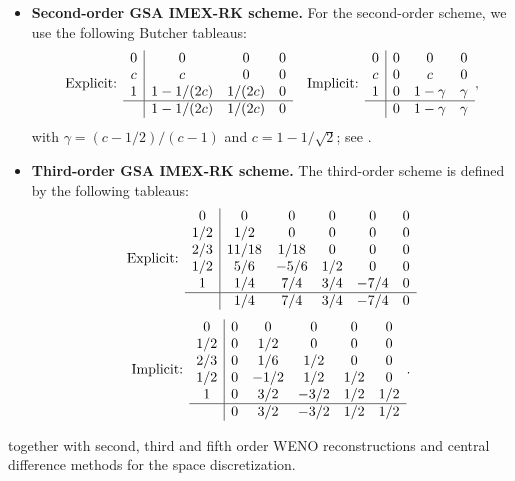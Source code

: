 \documentclass[final,11pt]{siamart251216}
\numberwithin{equation}{section}
\theoremstyle{definition}
\theoremstyle{remark}
\begin{document}
\begin{itemize}
    \item \textbf{Second-order GSA IMEX-RK scheme.}
    For the second-order scheme, we use the following Butcher tableaus:
    \begin{equation}
    \label{SecondOrderIMEX}
    \text{Explicit: } 
    \begin{array}{c|ccc}
        0 & 0 & 0 & 0 \\
        c & c & 0 & 0 \\
        1 & 1-1/(2c) & 1/(2c) & 0 \\ \hline
          & 1-1/(2c) & 1/(2c) & 0
    \end{array} \quad
    \text{Implicit: }
    \begin{array}{c|ccc}
        0 & 0 & 0 & 0 \\
        c & 0 & c & 0 \\
        1 & 0 & 1-\gamma & \gamma \\ \hline
          & 0 & 1-\gamma & \gamma
    \end{array},
    \end{equation}
    with $\gamma = (c-1/2)/(c-1)$ and $c = 1-1/\sqrt{2}$; see \cite{Bosc}.

    \item \textbf{Third-order GSA IMEX-RK scheme.}
    The third-order scheme is defined by the following tableaus:
    \begin{equation}
    \label{ThirdOrderIMEX}
    \text{Explicit: } 
    \begin{array}{c|ccccc}
        0           & 0 & 0 & 0 & 0 & 0 \\ 
        1/2         & 1/2 & 0 & 0 & 0 & 0 \\
        2/3         & 11/18 & 1/18 & 0 & 0 & 0 \\
        1/2         & 5/6 & -5/6 & 1/2 & 0 & 0 \\
        1           & 1/4 & 7/4 & 3/4 & -7/4 & 0 \\ \hline
                    & 1/4 & 7/4 & 3/4 & -7/4 & 0
    \end{array}
    \end{equation}
    \begin{equation*}
    \text{Implicit: }
    \begin{array}{c|ccccc}
        0           & 0 & 0 & 0 & 0 & 0 \\
        1/2         & 0 & 1/2 & 0 & 0 & 0 \\ 
        2/3         & 0 & 1/6 & 1/2 & 0 & 0 \\
        1/2         & 0 & -1/2 & 1/2 & 1/2 & 0 \\
        1           & 0 & 3/2 & -3/2 & 1/2 & 1/2 \\ \hline
                    & 0 & 3/2 & -3/2 & 1/2 & 1/2
    \end{array}.
    \end{equation*}
\end{itemize}
together with second, third and fifth order WENO reconstructions and central difference methods for the space discretization. 
\end{document}
